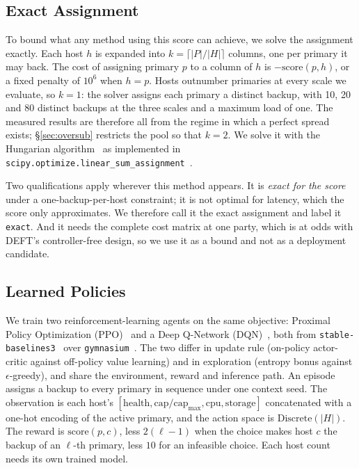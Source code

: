 \documentclass[journal]{IEEEtran}
\begin{document}
\subsection{Exact Assignment}
\label{sec:optimal}

To bound what any method using this score can achieve, we solve the assignment
exactly. Each host $h$ is expanded into
$k = \lceil |P| / |H| \rceil$ columns, one per primary it may back. The cost of
assigning primary $p$ to a column of $h$ is $-\mathrm{score}(p,h)$, or a fixed
penalty of $10^6$ when $h = p$. Hosts outnumber primaries at every scale we
evaluate, so $k = 1$: the solver assigns each primary a distinct backup, with 10,
20 and 80 distinct backups at the three scales and a maximum load of one. The
measured results are therefore all from the regime in which a perfect spread
exists; \S\ref{sec:oversub} restricts the pool so that $k = 2$. We
solve it with the Hungarian algorithm~\cite{kuhn1955hungarian} as implemented in
\texttt{scipy.optimize.linear\_sum\_assignment}~\cite{virtanen2020scipy}.

Two qualifications apply wherever this method appears. It is \emph{exact for the
score} under a one-backup-per-host constraint; it is not optimal for latency,
which the score only approximates. We therefore call it the exact assignment and
label it \texttt{exact}. And it needs the complete cost matrix at one party,
which is at odds with DEFT's controller-free design, so we use it as a bound and
not as a deployment candidate.

\subsection{Learned Policies}
\label{sec:rlmethod}

We train two reinforcement-learning agents on the same objective: Proximal
Policy Optimization (PPO)~\cite{schulman2017proximal} and a Deep Q-Network
(DQN)~\cite{mnih2015human}, both from
\texttt{stable-baselines3}~\cite{raffin2021stable} over
\texttt{gymnasium}~\cite{towers2024gymnasium}. The two differ in update rule
(on-policy actor-critic against off-policy value learning) and in exploration
(entropy bonus against $\epsilon$-greedy), and share the environment, reward and
inference path. An episode assigns a backup to every primary in sequence under
one context seed. The observation is each host's
$[\mathrm{health}, \mathrm{cap}/\mathrm{cap}_{\max}, \mathrm{cpu},
\mathrm{storage}]$ concatenated with a one-hot encoding of the active primary,
and the action space is $\mathrm{Discrete}(|H|)$. The reward is
$\mathrm{score}(p,c)$, less $2(\ell-1)$ when the choice makes host $c$ the
backup of an $\ell$-th primary, less $10$ for an infeasible choice. Each host
count needs its own trained model.
\end{document}
